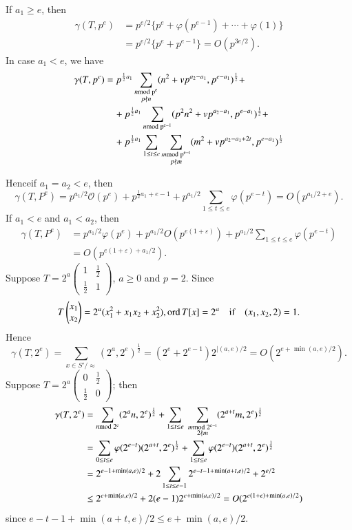 If $a_{1}\geq e$, then 
\begin{align*}
\gamma(T,p^{e}) &=
p^{e/2}\{p^{e}+\varphi(p^{e-1})+\cdots+\varphi(1)\}\\
&= p^{e/2}\{p^{e}+p^{e-1}\}=O(p^{3e/2}).
\end{align*}
In case $a_{1}<e$, we have 
\begin{align*}
\gamma(T,p^{e}) & =p^{\frac{1}{2}a_{1}}\sum_{\substack{n\rm{mod} \;
    p^{e}\\ p\nmid n}}(n^{2}+vp^{a_{2}-a_{1}},
  p^{e-a_{1}})^{\frac{1}{2}}+\\
&\quad +p^{\frac{1}{2}a_{1}}\sum_{n\rm{mod} \;
    p^{e-1}}(p^{2}n^{2}+vp^{a_{2}-a_{1}},
  p^{e-a_{1}})^{\frac{1}{2}}+\\
&\quad +p^{\frac{1}{2}a_{1}}\sum_{1\leq t\leq e}\sum_{\substack{m\rm{mod} \;
      p^{e-t}\\ p\nmid m}}(m^{2}+vp^{a_{2}-a_{1}+2t},
  p^{e-a_{1}})^{\frac{1}{2}} 
\end{align*}

Hence\pageoriginale if $a_{1}=a_{2}<e$, then
$$
\gamma(T,P^{e})=p^{a_{1}/2}\mathcal{O}(p^{e})+p^{\frac{1}{2}a_{1}+e-1}+p^{a_{1}/2}\sum_{1\leq
  t\leq e}\varphi(p^{e-t})=O(p^{a_{1}/2+e}).
$$
If $a_{1}<e$ and $a_{1}<a_{2}$, then
\begin{align*}
\gamma(T,P^{e}) &=
p^{a_{1}/2}\varphi(p^{e})+p^{a_{1}/2}O(p^{e(1+\varepsilon)})+p^{a_{1}/2}\sum_{1\leq
  t\leq e}\varphi(p^{e-t})\\
&= O(p^{e(1+\varepsilon)+a_{1}/2}). 
\end{align*}
Suppose $T=2^{a}\left(\begin{smallmatrix} 1 &
  \frac{1}{2}\\ \frac{1}{2} & 1\end{smallmatrix}\right)$, $a\geq 0$
  and $p=2$. Since
$$
T\begin{pmatrix}
x_{1}\\
x_{2}
\end{pmatrix}
=2^{a}(x^{2}_{1}+x_{1}x_{2}+x^{2}_{2}), \operatorname{ord}
T[x]=2^{a}\quad\text{if}\quad (x_{1},x_{2},2)=1.
$$
Hence 
$$
\gamma(T,2^{e})=\sum_{x\in S'/\approx}
(2^{a},2^{e})^{\frac{1}{2}}=(2^{e}+2^{e-1})2^{\mid
  (a,e)/2}=O(2^{e+\min(a,e)/2}).
$$
Suppose $T=2^{a}\left(\begin{smallmatrix} 0 &
  \frac{1}{2}\\ \frac{1}{2} & 0
\end{smallmatrix}\right)$; then 
\begin{align*}
\gamma(T,2^{e}) &=\sum\limits_{n\rm{mod} \;
  2^{e}}(2^{a}n, 2^{e})^{\frac{1}{2}}+\sum_{1\leq t\leq
  e} \; \sum_{\substack{m\rm{mod} \; 2^{e-t}\\ 2\nmid
    m}}(2^{a+t}m,2^{e})^{\frac{1}{2}}\\
&= \sum_{0\leq t\leq e}\varphi(2^{e-t})(2^{a+t},
2^{e})^{\frac{1}{2}}+\sum_{1\leq t\leq
  e}\varphi(2^{e-t})(2^{a+t},2^{e})^{\frac{1}{2}}\\
&= 2^{e-1+\min(a,e)/2}+2\sum_{1\leq t\leq
  e-1}2^{e-t-1+\min(a+t,e)/2}+2^{e/2}\\
&\leq
2^{e+\min(a,e)/2}+2(e-1)2^{e+\min(a,e)/2}=O(2^{e(1+\epsilon)+\min(a,e)/2})
\end{align*}
since $e-t-1+\min(a+t,e)/2\leq e+\min(a,e)/2$.


